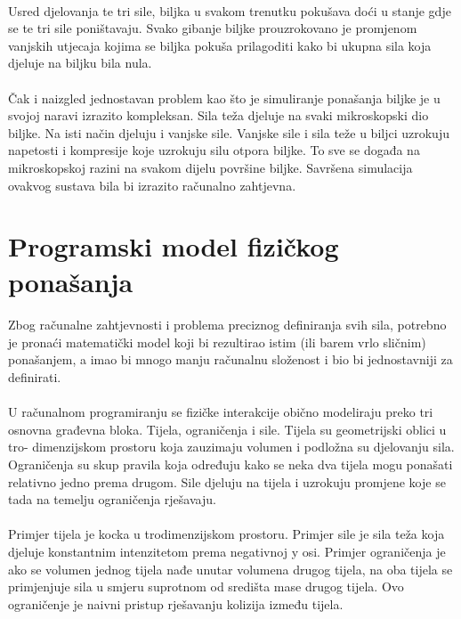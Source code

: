 \documentclass[times, utf8, diplomski]{fer}
\begin{document}
\paragraph{}
Usred djelovanja te tri sile, biljka u svakom trenutku pokušava doći u stanje gdje se te tri 
sile poništavaju. Svako gibanje biljke prouzrokovano je promjenom vanjskih utjecaja kojima 
se biljka pokuša prilagoditi kako bi ukupna sila koja djeluje na biljku bila nula.

\paragraph{}
Čak i naizgled jednostavan problem kao što je simuliranje ponašanja biljke je u svojoj 
naravi izrazito kompleksan. Sila teža djeluje na svaki mikroskopski dio biljke. Na isti 
način djeluju i vanjske sile. Vanjske sile i sila teže u biljci uzrokuju napetosti i 
kompresije koje uzrokuju silu otpora biljke. To sve se događa na mikroskopskoj razini na 
svakom dijelu površine biljke. Savršena simulacija ovakvog sustava bila bi izrazito  
računalno zahtjevna.

\section{Programski model fizičkog ponašanja} \label{physics_model}
\paragraph{}
Zbog računalne zahtjevnosti i problema preciznog definiranja svih sila, potrebno je pronaći
matematički model koji bi rezultirao istim (ili barem vrlo sličnim) ponašanjem, a imao bi 
mnogo manju računalnu složenost i bio bi jednostavniji za definirati.

\paragraph{}
U računalnom programiranju se fizičke interakcije obično modeliraju preko tri osnovna  
građevna bloka. Tijela, ograničenja i sile. Tijela su geometrijski oblici u tro-
dimenzijskom prostoru koja zauzimaju volumen i podložna su djelovanju sila. Ograničenja 
su skup pravila koja određuju kako se neka dva tijela mogu ponašati relativno jedno prema 
drugom. Sile djeluju na tijela i uzrokuju promjene koje se tada na temelju ograničenja 
rješavaju.

\paragraph{}
Primjer tijela je kocka u trodimenzijskom prostoru. Primjer sile je sila teža koja djeluje 
konstantnim intenzitetom prema negativnoj y osi. Primjer ograničenja je ako se volumen 
jednog tijela nađe unutar volumena drugog tijela, na oba tijela se primjenjuje sila u smjeru 
suprotnom od središta mase drugog tijela. Ovo ograničenje je naivni pristup rješavanju 
kolizija između tijela.
\end{document}
